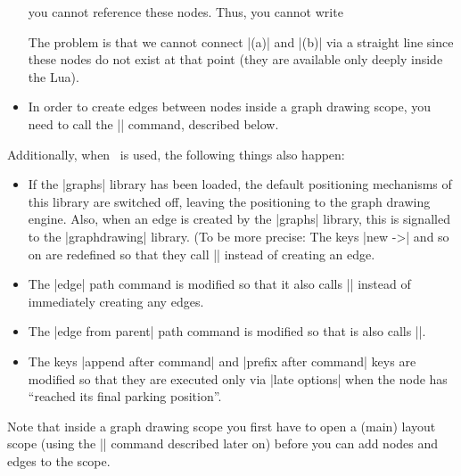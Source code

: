 \begin{command}{\pgfgdbeginscope}
\begin{itemize}
            you cannot reference these nodes. Thus, you cannot write
\begin{codeexample}
\end{codeexample}
            The problem is that we cannot connect |(a)| and |(b)| via a
            straight line since these nodes do not exist at that point (they
            are available only deeply inside the Lua).
        \item In order to create edges between nodes inside a graph drawing
            scope, you need to call the |\pgfgdedge| command, described below.
    \end{itemize}

    Additionally, when \tikzname\ is used, the following things also happen:
    \begin{itemize}
        \item If the |graphs| library has been loaded, the default positioning
            mechanisms of this library are switched off, leaving the
            positioning to the graph drawing engine. Also, when an edge is
            created by the |graphs| library, this is signalled to the
            |graphdrawing| library. (To be more precise: The keys |new ->| and
            so on are redefined so that they call |\pgfgdedge| instead of
            creating an edge.
        \item The |edge| path command is modified so that it also calls
            |\pgfgdedge| instead of immediately creating any edges.
        \item The |edge from parent| path command is modified so that is also
            calls |\pgfgdedge|.
        \item The keys |append after command| and |prefix after command| keys
            are modified so that they are executed only via |late options| when
            the node has ``reached its final parking position''.
    \end{itemize}

    Note that inside a graph drawing scope you first have to open a (main)
    layout scope (using the |\pgfgdbeginlayout| command described later on)
    before you can add nodes and edges to the scope.
\end{command}

